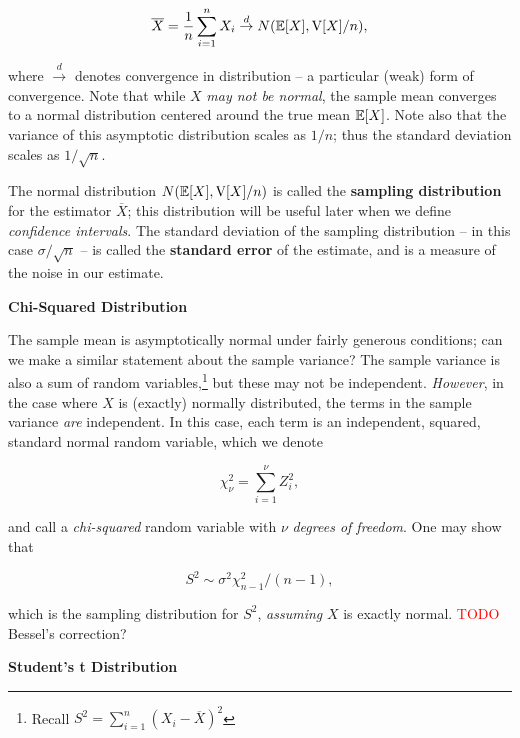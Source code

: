 \documentclass[../primer.tex]{subfiles}
\begin{document}
\begin{equation} \label{eq:mean-clt}
  \overline{X} = \frac{1}{n}\sum_{i=1}^n X_i \stackrel{d}{\to} N(\mathbb{E}[X], \mathrm{V}[X]/n),
\end{equation}

\noindent where $\stackrel{d}{\to}$ denotes convergence in distribution -- a
particular (weak) form of convergence. Note that while $X$ \emph{may not be
  normal}, the sample mean converges to a normal distribution centered around
the true mean $\mathbb{E}[X]$. Note also that the variance of this asymptotic
distribution scales as $1/n$; thus the standard deviation scales as
$1/\sqrt{n}$.

The normal distribution $N(\mathbb{E}[X], \mathrm{V}[X]/n)$ is called the \textbf{sampling
  distribution} for the estimator $\overline{X}$; this distribution will be
useful later when we define \emph{confidence intervals}. The standard deviation
of the sampling distribution -- in this case $\sigma/\sqrt{n}$ -- is called the
\textbf{standard error} of the estimate, and is a measure of the noise in our
estimate.

\noindent\textbf{Chi-Squared Distribution}

The sample mean is asymptotically normal under fairly generous conditions; can
we make a similar statement about the sample variance? The sample variance is
also a sum of random variables,\footnote{Recall $S^2 = \sum_{i=1}^n (X_i -
  \overline{X})^2$} but these may not be independent. \emph{However}, in the
case where $X$ is (exactly) normally distributed, the terms in the sample
variance \emph{are} independent. In this case, each term is an independent,
squared, standard normal random variable, which we denote

\begin{equation} \label{eq:chi-squared}
  \chi^2_{\nu} = \sum_{i=1}^{\nu} Z_i^2,
\end{equation}

\noindent and call a \emph{chi-squared} random variable with $\nu$ \emph{degrees
  of freedom}. One may show that

\begin{equation} \label{eq:sample-dist-var}
  S^2 \sim \sigma^2 \chi^2_{n-1} / (n-1),
\end{equation}

\noindent which is the sampling distribution for $S^2$, \emph{assuming} $X$ is
exactly normal. \textcolor{red}{TODO} Bessel's correction?

\noindent\textbf{Student's t Distribution}
\end{document}
